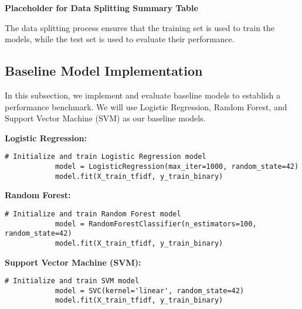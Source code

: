        \textbf{Placeholder for Data Splitting Summary Table}

        The data splitting process ensures that the training set is used to train the models, while the test set is used to evaluate their performance.
            
    \subsection{Baseline Model Implementation}
    
        In this subsection, we implement and evaluate baseline models to establish a performance benchmark. We will use Logistic Regression, Random Forest, and Support Vector Machine (SVM) as our baseline models.

        \textbf{Logistic Regression:}
        
        \vspace{0.5em}

        \begin{lstlisting}[caption={Train Logistic Regression model}, label={lst:logistic_regression}]
            # Initialize and train Logistic Regression model
            model = LogisticRegression(max_iter=1000, random_state=42)
            model.fit(X_train_tfidf, y_train_binary)
        \end{lstlisting}

        \textbf{Random Forest:}

        \vspace{0.5em}

        \begin{lstlisting}[caption={Train Random Forest model}, label={lst:random_forest}]
            # Initialize and train Random Forest model
            model = RandomForestClassifier(n_estimators=100, random_state=42)
            model.fit(X_train_tfidf, y_train_binary)
        \end{lstlisting}

        \textbf{Support Vector Machine (SVM):}
        
        \vspace{0.5em}

        \begin{lstlisting}[caption={Train SVM model}, label={lst:svm}]
            # Initialize and train SVM model
            model = SVC(kernel='linear', random_state=42)
            model.fit(X_train_tfidf, y_train_binary)
        \end{lstlisting}

